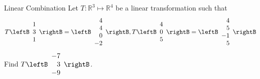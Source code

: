\begin{example}{Linear Combination}\label{exa:lintransfcombination}
Let $T:\mathbb{R}^3 \mapsto \mathbb{R}^4$ be a linear transformation such that 
\[
T \leftB \begin{array}{r}
1 \\
3 \\
1
\end{array} \rightB
=
\leftB \begin{array}{r}
4 \\
4 \\
0 \\
-2
\end{array} \rightB,
T \leftB \begin{array}{r}
4 \\
0 \\
5
\end{array} \rightB
=
\leftB \begin{array}{r}
4 \\
5 \\
-1 \\
5
\end{array} \rightB
\]
Find $T \leftB \begin{array}{r}
-7 \\
3 \\
-9
\end{array} \rightB$.
\end{example}

